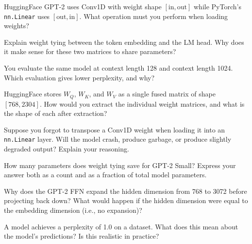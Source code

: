 \begin{reviewquestion}[1]
  HuggingFace GPT-2 uses Conv1D with weight shape
  $[\text{in}, \text{out}]$ while PyTorch's \texttt{nn.Linear} uses
  $[\text{out}, \text{in}]$. What operation must you perform when
  loading weights?
\end{reviewquestion}

\begin{reviewquestion}[2]
  Explain weight tying between the token embedding and the LM head.
  Why does it make sense for these two matrices to share parameters?
\end{reviewquestion}

\begin{reviewquestion}[3]
  You evaluate the same model at context length 128 and context length
  1024. Which evaluation gives lower perplexity, and why?
\end{reviewquestion}

\begin{reviewquestion}[4]
  HuggingFace stores $W_Q$, $W_K$, and $W_V$ as a single fused matrix
  of shape $[768, 2304]$. How would you extract the individual weight
  matrices, and what is the shape of each after extraction?
\end{reviewquestion}

\begin{reviewquestion}[5]
  Suppose you forgot to transpose a Conv1D weight when loading it into an
  \texttt{nn.Linear} layer. Will the model crash, produce garbage, or
  produce slightly degraded output? Explain your reasoning.
\end{reviewquestion}

\begin{reviewquestion}[6]
  How many parameters does weight tying save for GPT-2 Small? Express
  your answer both as a count and as a fraction of total model parameters.
\end{reviewquestion}

\begin{reviewquestion}[7]
  Why does the GPT-2 FFN expand the hidden dimension from 768 to 3072
  before projecting back down? What would happen if the hidden dimension
  were equal to the embedding dimension (i.e., no expansion)?
\end{reviewquestion}

\begin{reviewquestion}[8]
  A model achieves a perplexity of 1.0 on a dataset. What does this mean
  about the model's predictions? Is this realistic in practice?
\end{reviewquestion}


